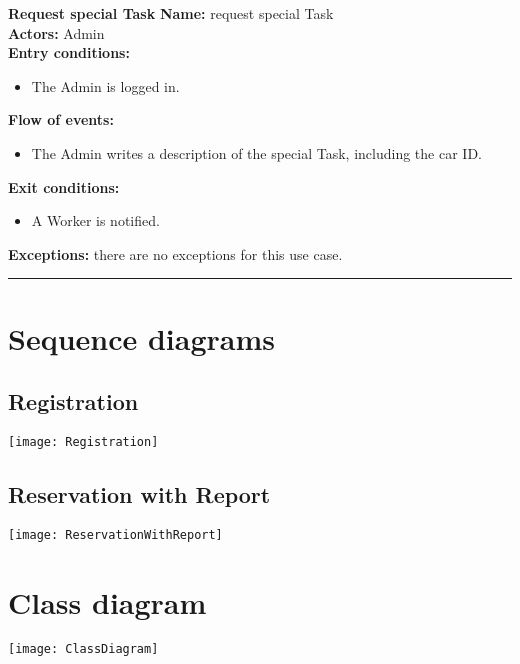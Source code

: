 \textbf{\large Request special Task}
\bigbreak
\textbf{Name:} request special Task \\
\textbf{Actors:} Admin \\
\textbf{Entry conditions:} 
\begin{itemize}
\item The Admin is logged in.
\end{itemize}
\textbf{Flow of events:} 
\begin{itemize}
\item The Admin writes a description of the special Task, including the car ID.
\end{itemize}
\textbf{Exit conditions:} 
\begin{itemize}
\item A Worker is notified.
\end{itemize}
\textbf{Exceptions:} there are no exceptions for this use case.\\


\begin{center}
\noindent\rule{8cm}{1.0pt}
\end{center}


\section{Sequence diagrams}
\subsection{Registration}
\begin{center}
\texttt{[image: Registration]}
\end{center}
\subsection{Reservation with Report}
\begin{center}
\texttt{[image: ReservationWithReport]}
\end{center}

\newpage
\section{Class diagram}
\begin{center}
\texttt{[image: ClassDiagram]}
\end{center}

